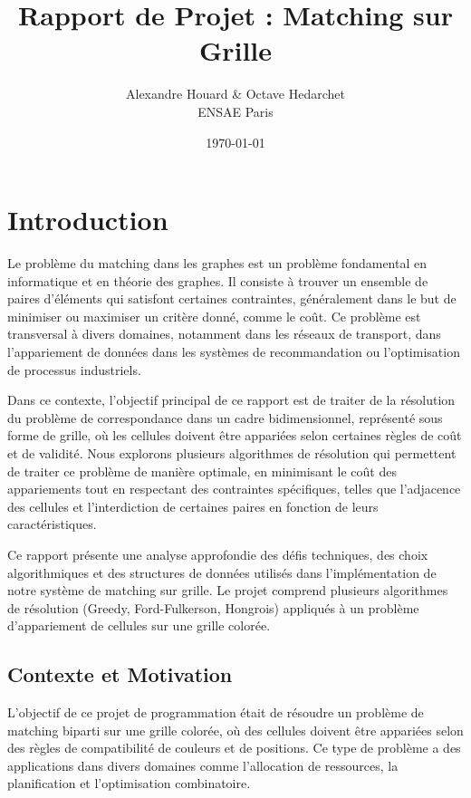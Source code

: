 \documentclass[11pt, a4paper]{article}
\title{\textbf{Rapport de Projet : Matching sur Grille}}
\author{
    Alexandre Houard \& Octave Hedarchet \\
    ENSAE Paris
}
\date{\today}
\begin{document}
\maketitle
\thispagestyle{empty} %

\newpage
\tableofcontents
\newpage

\section{Introduction}
\label{sec:introduction}

Le problème du matching dans les graphes est un problème fondamental en informatique et en théorie des graphes. Il consiste à trouver un ensemble de paires d'éléments qui satisfont certaines contraintes, généralement dans le but de minimiser ou maximiser un critère donné, comme le coût. Ce problème est transversal à divers domaines, notamment dans les réseaux de transport, dans l'appariement de données dans les systèmes de recommandation ou l'optimisation de processus industriels.

Dans ce contexte, l'objectif principal de ce rapport est de traiter de la résolution du problème de correspondance dans un cadre bidimensionnel, représenté sous forme de grille, où les cellules doivent être appariées selon certaines règles de coût et de validité. Nous explorons plusieurs algorithmes de résolution qui permettent de traiter ce problème de manière optimale, en minimisant le coût des appariements tout en respectant des contraintes spécifiques, telles que l'adjacence des cellules et l'interdiction de certaines paires en fonction de leurs caractéristiques.

Ce rapport présente une analyse approfondie des défis techniques, des choix algorithmiques et des structures de données utilisés dans l'implémentation de notre système de matching sur grille. Le projet comprend plusieurs algorithmes de résolution (Greedy, Ford-Fulkerson, Hongrois) appliqués à un problème d'appariement de cellules sur une grille colorée.

\subsection{Contexte et Motivation}

L'objectif de ce projet de programmation était de résoudre un problème de matching biparti sur une grille colorée, où des cellules doivent être appariées selon des règles de compatibilité de couleurs et de positions. Ce type de problème a des applications dans divers domaines comme l'allocation de ressources, la planification et l'optimisation combinatoire.
\end{document}
